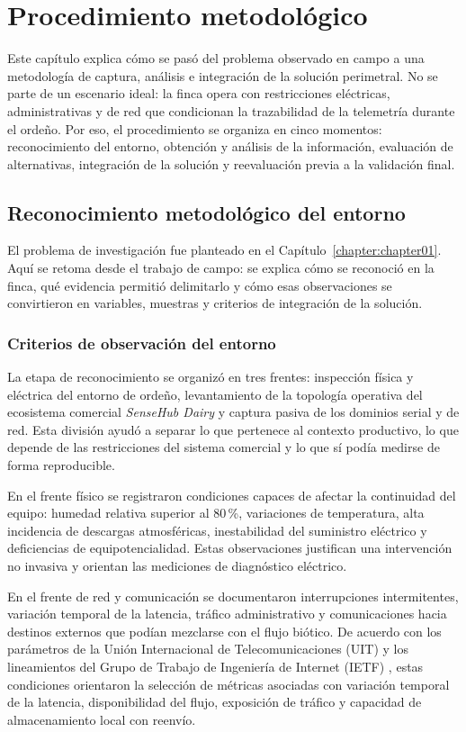 \chapter{Procedimiento metodológico}
\label{chapter:chapter04}

Este capítulo explica cómo se pasó del problema observado en campo a una metodología de captura, análisis e integración de la solución perimetral. No se parte de un escenario ideal: la finca opera con restricciones eléctricas, administrativas y de red que condicionan la trazabilidad de la telemetría durante el ordeño. Por eso, el procedimiento se organiza en cinco momentos: reconocimiento del entorno, obtención y análisis de la información, evaluación de alternativas, integración de la solución y reevaluación previa a la validación final.


\section{Reconocimiento metodológico del entorno}
\label{sec:reconocimiento-definicion-problema}
El problema de investigación fue planteado en el Capítulo~\ref{chapter:chapter01}. Aquí se retoma desde el trabajo de campo: se explica cómo se reconoció en la finca, qué evidencia permitió delimitarlo y cómo esas observaciones se convirtieron en variables, muestras y criterios de integración de la solución.

\subsection{Criterios de observación del entorno}
La etapa de reconocimiento se organizó en tres frentes: inspección física y eléctrica del entorno de ordeño, levantamiento de la topología operativa del ecosistema comercial \textit{SenseHub Dairy} y captura pasiva de los dominios serial y de red. Esta división ayudó a separar lo que pertenece al contexto productivo, lo que depende de las restricciones del sistema comercial y lo que sí podía medirse de forma reproducible.

En el frente físico se registraron condiciones capaces de afectar la continuidad del equipo: humedad relativa superior al 80\,\%, variaciones de temperatura, alta incidencia de descargas atmosféricas, inestabilidad del suministro eléctrico y deficiencias de equipotencialidad. Estas observaciones justifican una intervención no invasiva y orientan las mediciones de diagnóstico eléctrico.

En el frente de red y comunicación se documentaron interrupciones intermitentes, variación temporal de la latencia, tráfico administrativo y comunicaciones hacia destinos externos que podían mezclarse con el flujo biótico. De acuerdo con los parámetros de la Unión Internacional de Telecomunicaciones (\acs{UIT}) \cite{itu_iot_latency} y los lineamientos del Grupo de Trabajo de Ingeniería de Internet (\acs{IETF}) \cite{rfc3393}, estas condiciones orientaron la selección de métricas asociadas con variación temporal de la latencia, disponibilidad del flujo, exposición de tráfico y capacidad de almacenamiento local con reenvío.

